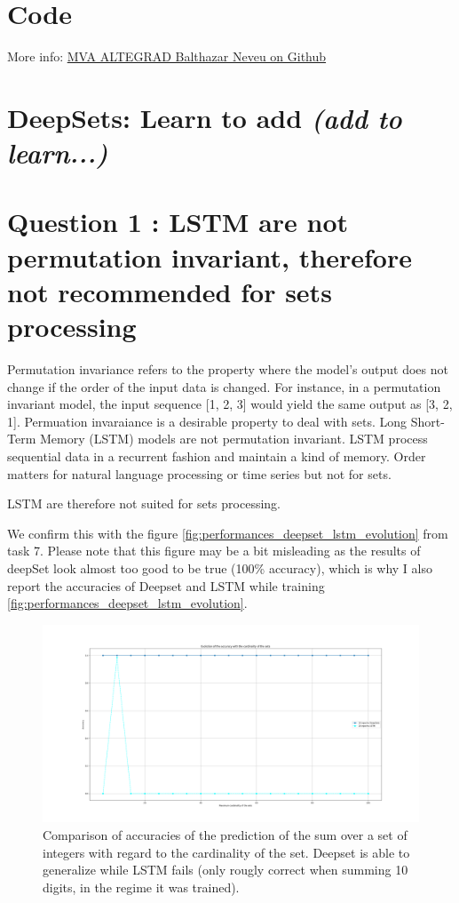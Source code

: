 \documentclass[a4paper]{article}
\begin{document}

\section*{Code}

More info:
\href{https://github.com/balthazarneveu/MVA23_ALTEGRAD/#readme}{MVA ALTEGRAD Balthazar Neveu on Github}

\section*{DeepSets: Learn to add \textit{(add to learn...)}}
\section*{Question 1 : LSTM are not permutation invariant, therefore not recommended for sets processing}
Permutation invariance refers to the property where the model's output does not change if the order of the input data is changed. For instance, in a permutation invariant model, the input sequence [1, 2, 3] would yield the same output as [3, 2, 1]. Permuation invaraiance is a desirable property to deal with sets.
\newline
Long Short-Term Memory (LSTM) models are not permutation invariant. LSTM process sequential data in a recurrent fashion and maintain a kind of memory. Order matters for natural language processing or time series but not for sets. 

LSTM are therefore not suited for sets processing.
\newline



We confirm this with the figure \ref{fig:performances_deepset_lstm_evolution} from task 7.
Please note that this figure may be a bit misleading  as the results of deepSet look almost too good to be true (100\% accuracy), which is why I also report the accuracies of Deepset and LSTM while training \ref{fig:performances_deepset_lstm_evolution}.

\begin{figure}[h]
    \centering
    \includegraphics[width=1.\textwidth]{figures/deep_set_performances.png}
    \caption{Comparison of accuracies of the prediction of the sum over a set of integers with regard to the cardinality of the set. Deepset is able to generalize while LSTM fails (only rougly correct when summing 10 digits, in the regime it was trained).}
    \label{fig:performances_deepset_lstm}
\end{figure}
\end{document}

